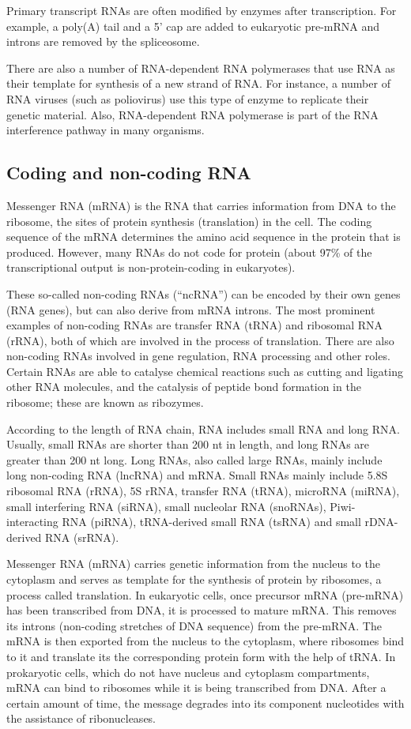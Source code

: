 Primary transcript RNAs are often modified by enzymes after transcription. For example, a poly(A) tail and a 5' cap are added to eukaryotic pre-mRNA and introns are removed by the spliceosome.

There are also a number of RNA-dependent RNA polymerases that use RNA as their template for synthesis of a new strand of RNA. For instance, a number of RNA viruses (such as poliovirus) use this type of enzyme to replicate their genetic material. Also, RNA-dependent RNA polymerase is part of the RNA interference pathway in many organisms.

\hypertarget{coding-and-non-coding-rna}{%
\subsection{Coding and non-coding RNA}\label{coding-and-non-coding-rna}}

Messenger RNA (mRNA) is the RNA that carries information from DNA to the ribosome, the sites of protein synthesis (translation) in the cell. The coding sequence of the mRNA determines the amino acid sequence in the protein that is produced. However, many RNAs do not code for protein (about 97\% of the transcriptional output is non-protein-coding in eukaryotes).

These so-called non-coding RNAs (``ncRNA'') can be encoded by their own genes (RNA genes), but can also derive from mRNA introns. The most prominent examples of non-coding RNAs are transfer RNA (tRNA) and ribosomal RNA (rRNA), both of which are involved in the process of translation. There are also non-coding RNAs involved in gene regulation, RNA processing and other roles. Certain RNAs are able to catalyse chemical reactions such as cutting and ligating other RNA molecules, and the catalysis of peptide bond formation in the ribosome; these are known as ribozymes.

According to the length of RNA chain, RNA includes small RNA and long RNA. Usually, small RNAs are shorter than 200 nt in length, and long RNAs are greater than 200 nt long. Long RNAs, also called large RNAs, mainly include long non-coding RNA (lncRNA) and mRNA. Small RNAs mainly include 5.8S ribosomal RNA (rRNA), 5S rRNA, transfer RNA (tRNA), microRNA (miRNA), small interfering RNA (siRNA), small nucleolar RNA (snoRNAs), Piwi-interacting RNA (piRNA), tRNA-derived small RNA (tsRNA) and small rDNA-derived RNA (srRNA).

Messenger RNA (mRNA) carries genetic information from the nucleus to the cytoplasm and serves as template for the synthesis of protein by ribosomes, a process called translation. In eukaryotic cells, once precursor mRNA (pre-mRNA) has been transcribed from DNA, it is processed to mature mRNA. This removes its introns (non-coding stretches of DNA sequence) from the pre-mRNA. The mRNA is then exported from the nucleus to the cytoplasm, where ribosomes bind to it and translate its the corresponding protein form with the help of tRNA. In prokaryotic cells, which do not have nucleus and cytoplasm compartments, mRNA can bind to ribosomes while it is being transcribed from DNA. After a certain amount of time, the message degrades into its component nucleotides with the assistance of ribonucleases.

